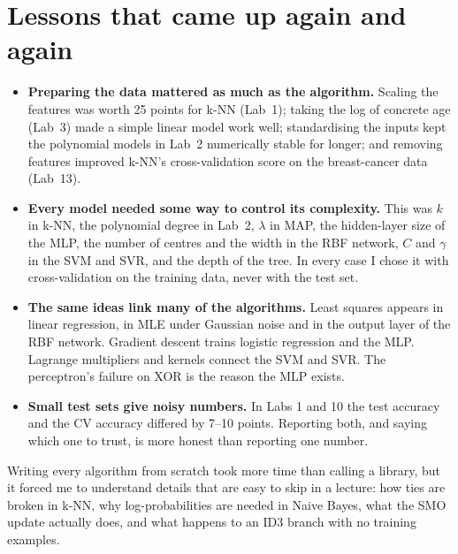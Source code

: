 \section*{Lessons that came up again and again}
\begin{itemize}
\item \textbf{Preparing the data mattered as much as the algorithm.} Scaling the features was worth 25
      points for k-NN (Lab~1); taking the log of concrete age (Lab~3) made a simple linear model work
      well; standardising the inputs kept the polynomial models in Lab~2 numerically stable for longer;
      and removing features improved k-NN's cross-validation score on the breast-cancer data (Lab~13).
\item \textbf{Every model needed some way to control its complexity.} This was $k$ in k-NN, the polynomial degree in Lab~2, $\lambda$ in
      MAP, the hidden-layer size of the MLP, the number of centres and the width in the RBF network,
      $C$ and $\gamma$ in the SVM and SVR, and the depth of the tree. In every case I chose it with
      cross-validation on the training data, never with the test set.
\item \textbf{The same ideas link many of the algorithms.} Least squares appears in linear regression, in
      MLE under Gaussian noise and in the output layer of the RBF network. Gradient descent trains logistic
      regression and the MLP. Lagrange multipliers and kernels connect the SVM and SVR. The perceptron's
      failure on XOR is the reason the MLP exists.
\item \textbf{Small test sets give noisy numbers.} In Labs 1 and 10 the test accuracy and the CV
      accuracy differed by 7--10 points. Reporting both, and saying which one to trust, is more honest
      than reporting one number.
\end{itemize}

Writing every algorithm from scratch took more time than calling a library, but it forced me to
understand details that are easy to skip in a lecture: how ties are broken in k-NN, why log-probabilities
are needed in Naive Bayes, what the SMO update actually does, and what happens to an ID3 branch with no
training examples.

